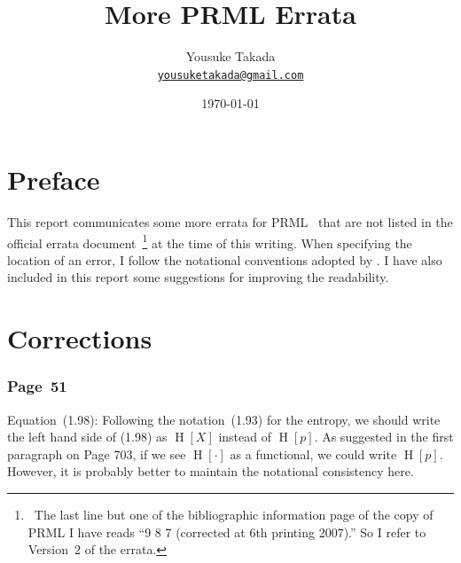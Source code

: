 \documentclass[12pt,a4paper]{article}
\newcommand{\email}[1]{\href{mailto:#1}{\texttt{#1}}}
\newcommand{\erratum}[1]{\subsubsection*{#1}}
\begin{document}
\title{More PRML Errata}
\author{Yousuke Takada \\ \email{yousuketakada@gmail.com}}
\date{\today}
\maketitle

\section*{Preface}
This report communicates some more errata for PRML~\citep{Bishop:PRML}
that are not listed in the official errata document~\citep{Svensen:PRML_errata}\footnote{\
The last line but one of the bibliographic information page of the copy of PRML I have
reads ``9 8 7 (corrected at 6th printing 2007).'' So I refer to Version~2 of the errata.}
at the time of this writing.
When specifying the location of an error, I follow the notational conventions adopted by
\citet{Svensen:PRML_errata}.
I have also included in this report some suggestions for improving the readability.

\section*{Corrections}

\erratum{Page~51}
Equation~(1.98):
Following the notation~(1.93) for the entropy, we should write the left hand side of (1.98) as
$\operatorname{H}[X]$ instead of $\operatorname{H}[p]$.
As suggested in the first paragraph on Page 703,
if we see $\operatorname{H}[\cdot]$ as a functional,
we could write $\operatorname{H}[p]$.
However, it is probably better to maintain the notational consistency here.
\end{document}

